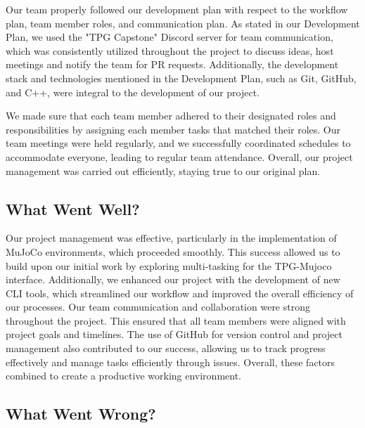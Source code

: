 \documentclass{article}
\begin{document}

Our team properly followed our development plan with respect to the workflow plan, team member roles, and communication plan. As stated in our Development Plan, we used the "TPG Capstone" Discord server for team communication, which was consistently utilized throughout the project to discuss ideas, host meetings and notify the team for PR requests. Additionally, the development stack and technologies mentioned in the Development Plan, such as Git, GitHub, and C++, were integral to the development of our project.

We made sure that each team member adhered to their designated roles and responsibilities by assigning each member tasks that matched their roles. Our team meetings were held regularly, and we successfully coordinated schedules to accommodate everyone, leading to regular team attendance. Overall, our project management was carried out efficiently, staying true to our original plan.


\subsection{What Went Well?}


Our project management was effective, particularly in the implementation of MuJoCo environments, which proceeded smoothly. This success allowed us to build upon our initial work by exploring multi-tasking for the TPG-Mujoco interface. Additionally, we enhanced our project with the development of new CLI tools, which streamlined our workflow and improved the overall efficiency of our processes. Our team communication and collaboration were strong throughout the project. This ensured that all team members were aligned with project goals and timelines. The use of GitHub for version control and project management also contributed to our success, allowing us to track progress effectively and manage tasks efficiently through issues. Overall, these factors combined to create a productive working environment.
\subsection{What Went Wrong?}
\end{document}

